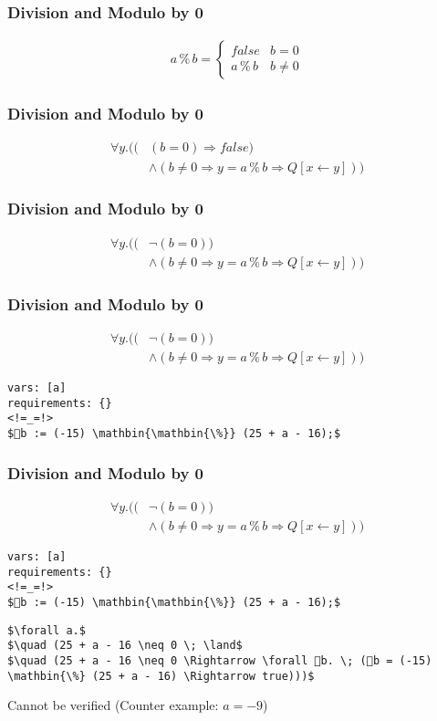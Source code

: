 \begin{frame}[containsverbatim]
  \frametitle{Division and Modulo by 0}
\begin{align*}
  a \mathbin{\%} b = \begin{cases}
        false & b = 0\\
        a \mathbin{\%} b & b \neq 0
         \end{cases}
\end{align*}
\end{frame}


\begin{frame}[containsverbatim]
  \frametitle{Division and Modulo by 0}
\begin{align*}
\forall y . ( (&(b = 0) \Rightarrow false) \\
                &\land (b \neq 0 \Rightarrow y = a \mathbin{\%} b \Rightarrow Q[x \leftarrow y]))
\end{align*}
\end{frame}

\begin{frame}[containsverbatim]
  \frametitle{Division and Modulo by 0}
\begin{align*}
\forall y . ( (&\neg (b = 0)) \\
                &\land (b \neq 0 \Rightarrow y = a \mathbin{\%} b \Rightarrow Q[x \leftarrow y]))
\end{align*}
\end{frame}


\begin{frame}[containsverbatim]
  \frametitle{Division and Modulo by 0}
\begin{align*}
\forall y . ( (&\neg (b = 0)) \\
                &\land (b \neq 0 \Rightarrow y = a \mathbin{\%} b \Rightarrow Q[x \leftarrow y]))
\end{align*}
\begin{lstlisting}[mathescape=true]
vars: [a]
requirements: {}
<!=_=!>
$👻b := (-15) \mathbin{\mathbin{\%}} (25 + a - 16);$
\end{lstlisting}
\end{frame}

\begin{frame}[containsverbatim]
  \frametitle{Division and Modulo by 0}
\begin{align*}
\forall y . ( (&\neg (b = 0)) \\
                &\land (b \neq 0 \Rightarrow y = a \mathbin{\%} b \Rightarrow Q[x \leftarrow y]))
\end{align*}
\begin{lstlisting}[mathescape=true]
vars: [a]
requirements: {}
<!=_=!>
$👻b := (-15) \mathbin{\mathbin{\%}} (25 + a - 16);$
\end{lstlisting}
\begin{lstlisting}[mathescape=true]
$\forall a.$
$\quad (25 + a - 16 \neq 0 \; \land$
$\quad (25 + a - 16 \neq 0 \Rightarrow \forall 👻b. \; (👻b = (-15) \mathbin{\%} (25 + a - 16) \Rightarrow true)))$
\end{lstlisting}
Cannot be verified (Counter example: $a = -9$)
\end{frame}
